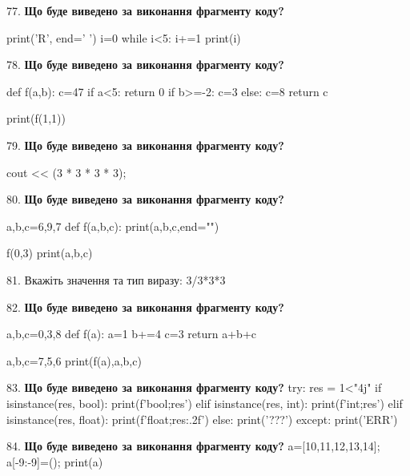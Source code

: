 \documentclass[11pt]{article}
\begin{document}
77. \textbf{Що буде виведено за виконання фрагменту коду?}

print('R', end=' ')
i=0
while i<5:
    i+=1
print(i)

\par\vspace{5mm}

78. \textbf{Що буде виведено за виконання фрагменту коду?}

def f(a,b):
    c=47
    if a<5:
        return 0
    if b>=-2:
         c=3
    else: 
        c=8
    return c

print(f(1,1))
\par\vspace{5mm}

79. \textbf{Що буде виведено за виконання фрагменту коду?}

cout << (3 * 3 * 3 * 3);
\par\vspace{5mm}

80. \textbf{Що буде виведено за виконання фрагменту коду?}

a,b,c=6,9,7
def f(a,b,c):
    print(a,b,c,end="")

f(0,3)
print(a,b,c)

\par\vspace{5mm}

81. 
Вкажіть значення та тип виразу:
3/3*3*3
\par\vspace{5mm}

82. \textbf{Що буде виведено за виконання фрагменту коду?}

a,b,c=0,3,8
def f(a):
    a=1
    b+=4
    c=3
    return a+b+c

a,b,c=7,5,6
print(f(a),a,b,c)
\par\vspace{5mm}

83. \textbf{Що буде виведено за виконання фрагменту коду?}
try:
    res = 1<"4j"
    if isinstance(res, bool):
        print(f'bool;{res}')
    elif isinstance(res, int):
        print(f'int;{res}')
    elif isinstance(res, float):
        print(f'float;{res:.2f}')
    else:
        print('???')
except:
    print('ERR')
\par\vspace{5mm}

84. \textbf{Що буде виведено за виконання фрагменту коду?}
a=[10,11,12,13,14]; a[-9:-9]=(); print(a)\par\vspace{5mm}
\end{document}
